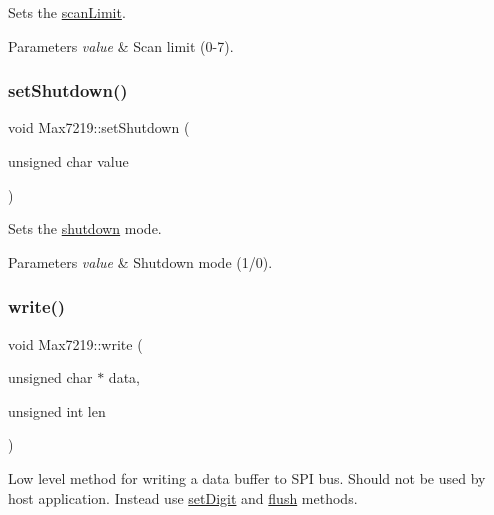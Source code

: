 Sets the \hyperlink{classdrumpi_1_1Max7219_a605af97de38c0f8fd581ba17e6ce4f37}{scan\+Limit}. 
\begin{DoxyParams}{Parameters}
{\em value} & Scan limit (0-\/7). \\
\hline
\end{DoxyParams}
\mbox{\label{classdrumpi_1_1Max7219_a7b4ded1ec0a564ef12fb1ed4fd45bd1c}} 
\subsubsection{\texorpdfstring{set\+Shutdown()}{setShutdown()}}
{\footnotesize\ttfamily void Max7219\+::set\+Shutdown (\begin{DoxyParamCaption}\item[{unsigned char}]{value }\end{DoxyParamCaption})}

Sets the \hyperlink{classdrumpi_1_1Max7219_a0b1b2c31442fe9a3a1db3cdae5dd32e8}{shutdown} mode. 
\begin{DoxyParams}{Parameters}
{\em value} & Shutdown mode (1/0). \\
\hline
\end{DoxyParams}
\mbox{\label{classdrumpi_1_1Max7219_aaf2f49b227cb65ead3ce0811714fe592}} 
\subsubsection{\texorpdfstring{write()}{write()}}
{\footnotesize\ttfamily void Max7219\+::write (\begin{DoxyParamCaption}\item[{unsigned char $\ast$}]{data,  }\item[{unsigned int}]{len }\end{DoxyParamCaption})\hspace{0.3cm}{\ttfamily [private]}}

Low level method for writing a data buffer to S\+PI bus. Should not be used by host application. Instead use \hyperlink{classdrumpi_1_1Max7219_ad85d8d612e1c7a817da7d18bd9f336da}{set\+Digit} and \hyperlink{classdrumpi_1_1Max7219_a3b3f0f2a947caf27f65bd626f8e71f43}{flush} methods.


